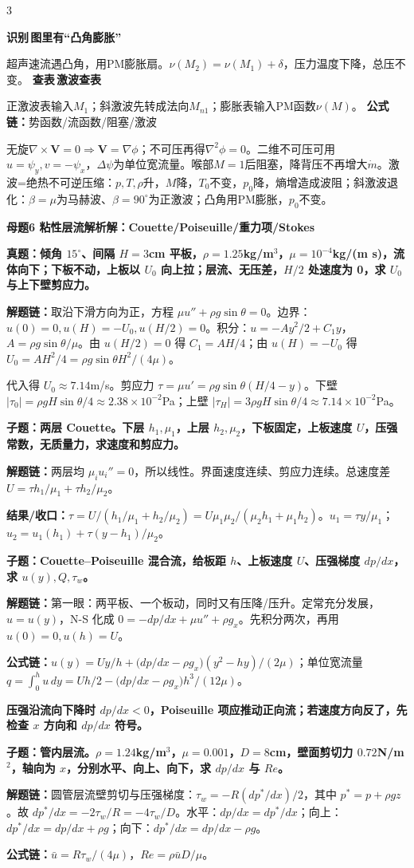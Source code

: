 \documentclass[a4paper]{article}
\newcommand{\mt}[1]{\vspace{0.45pt}\colorbox{M}{\parbox{\dimexpr\linewidth-2\fboxsep}{\color{white}\bfseries #1}}\par}
\newcommand{\qt}[1]{\vspace{0.25pt}\colorbox{Q}{\parbox{\dimexpr\linewidth-2\fboxsep}{\color{white}\bfseries #1}}\par}
\newcommand{\ans}[1]{\colorbox{G}{\parbox{\dimexpr\linewidth-2\fboxsep}{#1}}\par}
\newcommand{\warn}[1]{\colorbox{Y}{\parbox{\dimexpr\linewidth-2\fboxsep}{\color{E}\bfseries #1}}\par}
\newcommand{\chain}[1]{{\color{A}\bfseries 解题链：}#1\par}
\newcommand{\res}[1]{{\color{E}\bfseries 结果/收口：}#1\par}
\newcommand{\form}[1]{{\color{M}\bfseries 公式链：}#1\par}
\newcommand{\labtag}[3]{{\bfseries\color{#1}\colorbox{#1}{\color{white}\fontsize{2.35}{2.48}\selectfont #2}\,#3}\par}
\newcommand{\iden}[1]{\labtag{C}{识别}{#1}}
\newcommand{\lookup}[1]{\labtag{C}{查表}{#1}}
\newcommand{\idq}[1]{\iden{#1}}
\newcommand{\formq}[1]{\form{#1}}
\newcommand{\lookq}[1]{\lookup{#1}}
\newenvironment{vfourWrap}{\par\begingroup\fontsize{2.68}{2.84}\selectfont\setlength{\fboxsep}{0.45pt}}{\par\endgroup}
\begin{document}
\begin{multicols}{3}
\begin{vfourWrap}
\idq{图里有“凸角膨胀”}
超声速流遇凸角，用PM膨胀扇。$\nu(M_2)=\nu(M_1)+\delta$，压力温度下降，总压不变。
\lookq{激波查表}
正激波表输入$M_1$；斜激波先转成法向$M_{n1}$；膨胀表输入PM函数$\nu(M)$。
\formq{势函数/流函数/阻塞/激波}
无旋$\nabla\times\bm V=0\Rightarrow\bm V=\nabla\phi$；不可压再得$\nabla^2\phi=0$。二维不可压可用$u=\psi_y,v=-\psi_x$，$\Delta\psi$为单位宽流量。喉部$M=1$后阻塞，降背压不再增大$\dot m$。激波=绝热不可逆压缩：$p,T,\rho$升，$M$降，$T_0$不变，$p_0$降，熵增造成波阻；斜激波退化：$\beta=\mu$为马赫波、$\beta=90^\circ$为正激波；凸角用PM膨胀，$p_0$不变。
\end{vfourWrap}
\mt{母题6 粘性层流解析解：Couette/Poiseuille/重力项/Stokes}
\qt{真题：倾角 $15^\circ$、间隔 $H=3$cm 平板，$\rho=1.25$kg/m$^3$，$\mu=10^{-4}$kg/(m s)，流体向下；下板不动，上板以 $U_0$ 向上拉；层流、无压差，$H/2$ 处速度为 0，求 $U_0$ 与上下壁剪应力。}
\chain{取沿下滑方向为正，方程 $\mu u''+\rho g\sin\theta=0$。边界：$u(0)=0,u(H)=-U_0,u(H/2)=0$。积分：$u=-Ay^2/2+C_1y$，$A=\rho g\sin\theta/\mu$。由 $u(H/2)=0$ 得 $C_1=AH/4$；由 $u(H)=-U_0$ 得 $U_0=AH^2/4=\rho g\sin\theta H^2/(4\mu)$。}
\ans{代入得 $U_0\approx7.14$m/s。剪应力 $\tau=\mu u'=\rho g\sin\theta(H/4-y)$。下壁 $|\tau_0|=\rho gH\sin\theta/4\approx2.38\times10^{-2}$Pa；上壁 $|\tau_H|=3\rho gH\sin\theta/4\approx7.14\times10^{-2}$Pa。}

\qt{子题：两层 Couette。下层 $h_1,\mu_1$，上层 $h_2,\mu_2$，下板固定，上板速度 $U$，压强常数，无质量力，求速度和剪应力。}
\chain{两层均 $\mu_i u_i''=0$，所以线性。界面速度连续、剪应力连续。总速度差 $U=\tau h_1/\mu_1+\tau h_2/\mu_2$。}
\res{$\tau=U/(h_1/\mu_1+h_2/\mu_2)=U\mu_1\mu_2/(\mu_2h_1+\mu_1h_2)$。$u_1=\tau y/\mu_1$；$u_2=u_1(h_1)+\tau(y-h_1)/\mu_2$。}

\qt{子题：Couette--Poiseuille 混合流，给板距 $h$、上板速度 $U$、压强梯度 $dp/dx$，求 $u(y),Q,\tau_w$。}
\chain{第一眼：两平板、一个板动，同时又有压降/压升。定常充分发展，$u=u(y)$，N-S 化成 $0=-dp/dx+\mu u''+\rho g_x$。先积分两次，再用 $u(0)=0,u(h)=U$。}
\form{$u(y)=Uy/h+\big(dp/dx-\rho g_x\big)(y^2-hy)/(2\mu)$；单位宽流量 $q=\int_0^hu\,dy=Uh/2-\big(dp/dx-\rho g_x\big)h^3/(12\mu)$。}
\warn{压强沿流向下降时 $dp/dx<0$，Poiseuille 项应推动正向流；若速度方向反了，先检查 $x$ 方向和 $dp/dx$ 符号。}

\qt{子题：管内层流。$\rho=1.24$kg/m$^3$，$\mu=0.001$，$D=8$cm，壁面剪切力 $0.72$N/m$^2$，轴向为 $x$，分别水平、向上、向下，求 $dp/dx$ 与 $Re$。}
\chain{圆管层流壁剪切与压强梯度：$\tau_w=-R(dp^*/dx)/2$，其中 $p^*=p+\rho gz$。故 $dp^*/dx=-2\tau_w/R=-4\tau_w/D$。水平：$dp/dx=dp^*/dx$；向上：$dp^*/dx=dp/dx+\rho g$；向下：$dp^*/dx=dp/dx-\rho g$。}
\form{$\bar u=R\tau_w/(4\mu)$，$Re=\rho\bar uD/\mu$。}


\end{multicols}
\end{document}
